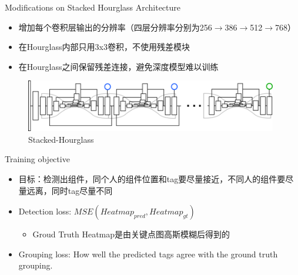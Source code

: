 \documentclass{ctexbeamer}
\begin{document}
  \begin{frame}{Modifications on Stacked Hourglass Architecture}
    \begin{itemize}
    \item 增加每个卷积层输出的分辨率（四层分辨率分别为256$\rightarrow$386$\rightarrow$512$\rightarrow$768）
    \item 在Hourglass内部只用3x3卷积，不使用残差模块
    \item 在Hourglass之间保留残差连接，避免深度模型难以训练
    \end{itemize}
    
    \begin{figure}
      \includegraphics[width=11cm]{fig/stacked-hg-2.png}
    \caption{\label{fig:stack-hourglass-modify}Stacked-Hourglass}
      \end{figure}
    
    \vskip 1cm
    \end{frame}
    \begin{frame}{Training objective}
      \begin{itemize}
      \item 目标：检测出组件，同个人的组件位置和tag要尽量接近，不同人的组件要尽量远离，同时tag尽量不同
      \item Detection loss: $MSE(Heatmap_{pred}, Heatmap_{gt})$
      \begin{itemize}
        \item Groud Truth Heatmap是由关键点图高斯模糊后得到的
        \end{itemize}
      \item Grouping loss: How well the predicted tags agree with the ground truth grouping.
      \end{itemize}
      \vskip 1cm
      \end{frame}
\end{document}
